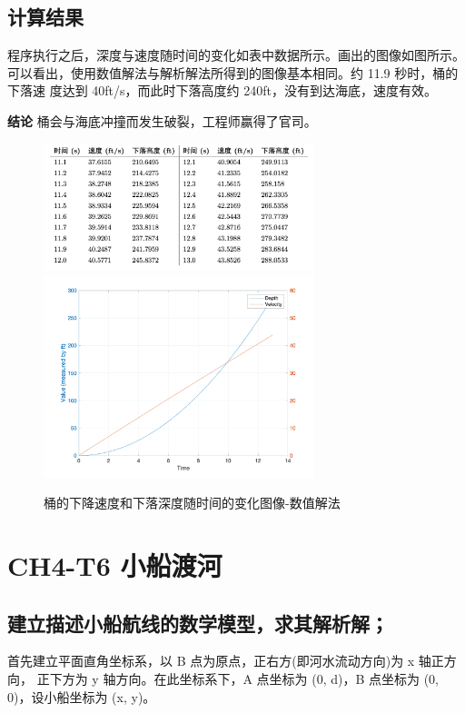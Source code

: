 \documentclass{article}
\begin{document}
\subsection{计算结果}

程序执行之后，深度与速度随时间的变化如表中数据所示。画出的图像如图所示。 可以看出，使用数值解法与解析解法所得到的图像基本相同。约 11.9 秒时，桶的下落速
度达到 40ft/s，而此时下落高度约 240ft，没有到达海底，速度有效。

\textbf{结论} 桶会与海底冲撞而发生破裂，工程师赢得了官司。

\begin{figure}[H]
    \centering
    \includegraphics[width=0.7\textwidth]{table61.png}
    \includegraphics[width=0.7\textwidth]{pic8.png}
    \caption{桶的下降速度和下落深度随时间的变化图像-数值解法}
\end{figure}


\newpage

\section{CH4-T6 小船渡河}
\subsection{建立描述小船航线的数学模型，求其解析解；}
首先建立平面直角坐标系，以 B 点为原点，正右方(即河水流动方向)为 x 轴正方向， 正下方为 y 轴方向。在此坐标系下，A 点坐标为 (0, d)，B 点坐标为 (0, 0)，设小船坐标为 (x, y)。
\end{document}
